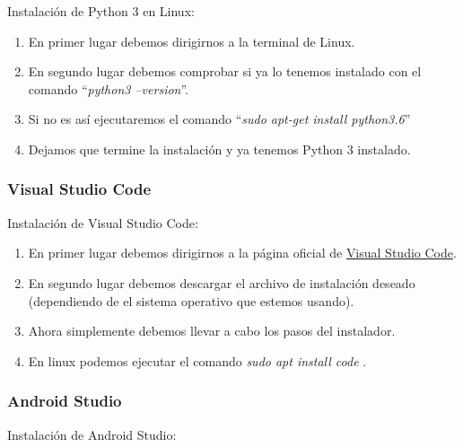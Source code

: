 Instalación de Python 3 en Linux:
\begin{enumerate}
\item
	En primer lugar debemos dirigirnos a la terminal de Linux.
\item
	En segundo lugar debemos comprobar si ya lo tenemos instalado con el comando ``\textit{python3 --version}''.
\item
	Si no es así ejecutaremos el comando ``\textit{sudo apt-get install python3.6}''
\item
	Dejamos que termine la instalación y ya tenemos Python 3 instalado.
\end{enumerate}

\subsubsection{Visual Studio Code}

Instalación de Visual Studio Code:

\begin{enumerate}
\item
	En primer lugar debemos dirigirnos a la página oficial de \href{https://code.visualstudio.com/}{Visual Studio Code}.
\item
	En segundo lugar debemos descargar el archivo de instalación deseado (dependiendo de el sistema operativo que estemos usando).
\item 
	Ahora simplemente debemos llevar a cabo los pasos del instalador.

\item
	En linux podemos ejecutar el comando \textit{sudo apt install code} \cite{vscforrasp}.
\end{enumerate}

\subsubsection{Android Studio}

Instalación de Android Studio:

